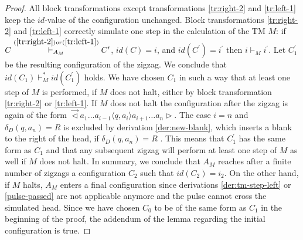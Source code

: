 \documentclass[pre,amssymb,showpacs,showkeys,preprint]{revtex4}
\begin{document}
\begin{proof}
All block transformations except transformations \ref{tr:right-2} and
\ref{tr:left-1} keep the $\mathit{id}$-value of the configuration unchanged.
Block transformations \ref{tr:right-2} and \ref{tr:left-1} correctly simulate
one step in the calculation of the TM $M$:
if
$C \stackrel{(\ref{tr:right-2}) or (\ref{tr:left-1})}{\vdash_{A_M}} C^\prime$, $id(C)=i$, and $id(C^\prime)=i^\prime$
then $i \vdash_M i^\prime$.
Let $C_1^\prime$ be the resulting configuration of the zigzag.
We conclude that $\mathit{id}(C_1) \vdash_M^* \mathit{id}(C_1^\prime)$ holds.
We have chosen $C_1$ in such a way that at least one step of $M$ is performed, if $M$ does not halt, either by
block transformation \ref{tr:right-2} or \ref{tr:left-1}.
If $M$ does not halt the configuration after the zigzag is again of the form
$\overrightarrow{\lhd}  a_1 \ldots a_{i-1} \langle q,a_i \rangle a_{i+1} \ldots a_n \rhd$.
The case $i = n$ and $\delta_D(q,a_n) = R$ is excluded by derivation \ref{der:new-blank},
which inserts a blank to the right of the head, if $\delta_D(q,a_n) = R$ .
This means that $C_1^\prime$ has the same form as $C_1$ and that any subsequent zigzag will  perform at
least one step of $M$ as well if $M$ does not halt.
In summary, we conclude that $A_M$ reaches after a finite number of zigzags a configuration $C_2$ such that
$\mathit{id}(C_2) = i_2$.
On the other hand, if $M$ halts, $A_M$ enters a final configuration since derivations
\ref{der:tm-step-left} or \ref{pulse-passed} are not applicable anymore
and the pulse cannot cross the simulated head.
Since we have chosen $C_0$ to be of the same form
as $C_1$ in the beginning of the proof, the addendum of the lemma regarding the initial configuration is true.
\end{proof}
\end{document}

